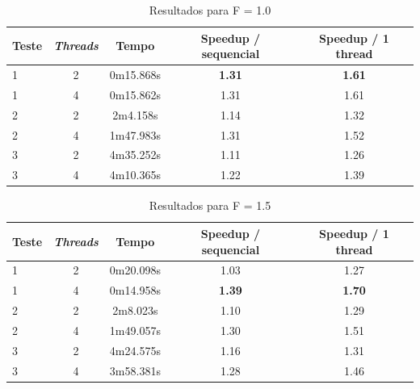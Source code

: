 \documentclass[12pt]{article}
\begin{document}
\begin{table}[H]
  \begin{center}
    \begin{tabular}{ | l | c | c | c | c |}
      \hline
      \textbf{Teste} & \textbf{\textit{Threads}} & \textbf{Tempo} & \textbf{Speedup / sequencial} & \textbf{Speedup / 1 thread}\\ \hline
      1 & 2 & 0m15.868s & \textbf{1.31} & \textbf{1.61} \\ \hline
      1 & 4 & 0m15.862s & 1.31 & 1.61 \\ \hline
      2 & 2 & 2m4.158s & 1.14 & 1.32 \\ \hline
      2 & 4 & 1m47.983s & 1.31 & 1.52 \\ \hline
      3 & 2 & 4m35.252s & 1.11 & 1.26 \\ \hline
      3 & 4 & 4m10.365s & 1.22 & 1.39 \\ \hline
  \end{tabular}
  \caption{Resultados para F = 1.0}
  \label{tbl:resultados1}
  \end{center}
\end{table}

\begin{table}[H]
   \begin{center}
    \begin{tabular}{ | l | c | c | c | c |}
      \hline
      \textbf{Teste} & \textbf{\textit{Threads}} & \textbf{Tempo} & \textbf{Speedup / sequencial} & \textbf{Speedup / 1 thread}\\ \hline
      1 & 2 & 0m20.098s & 1.03 & 1.27 \\ \hline
      1 & 4 & 0m14.958s & \textbf{1.39} & \textbf{1.70} \\ \hline
      2 & 2 & 2m8.023s & 1.10 & 1.29 \\ \hline
      2 & 4 & 1m49.057s & 1.30 & 1.51 \\ \hline
      3 & 2 & 4m24.575s & 1.16 & 1.31 \\ \hline
      3 & 4 & 3m58.381s & 1.28 & 1.46 \\ \hline
  \end{tabular}
  \caption{Resultados para F = 1.5}
  \label{tbl:resultados15}
  \end{center}
\end{table}
\end{document}
